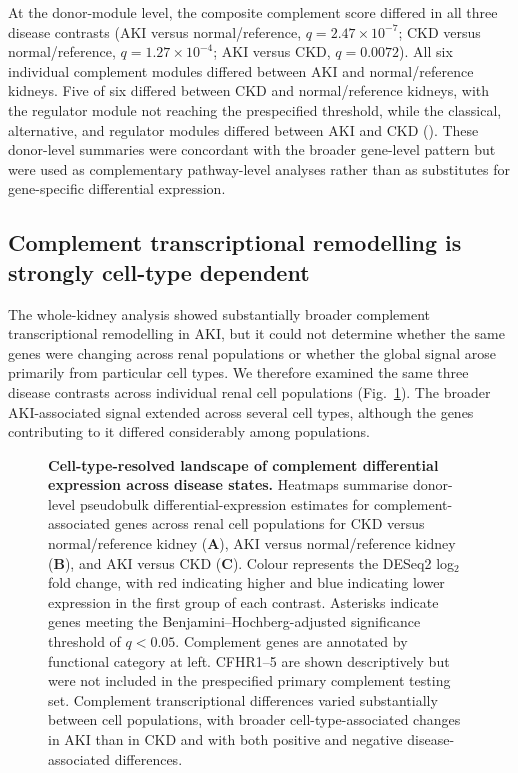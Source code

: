 \documentclass[10pt,letterpaper]{article}
\begin{document}
At the donor-module level, the composite complement score differed in all three disease contrasts (AKI versus normal/reference, $q=2.47\times10^{-7}$; CKD versus normal/reference, $q=1.27\times10^{-4}$; AKI versus CKD, $q=0.0072$). All six individual complement modules differed between AKI and normal/reference kidneys. Five of six differed between CKD and normal/reference kidneys, with the regulator module not reaching the prespecified threshold, while the classical, alternative, and regulator modules differed between AKI and CKD (). These donor-level summaries were concordant with the broader gene-level pattern but were used as complementary pathway-level analyses rather than as substitutes for gene-specific differential expression.


\subsection*{Complement transcriptional remodelling is strongly cell-type dependent}

The whole-kidney analysis showed substantially broader complement transcriptional remodelling in AKI, but it could not determine whether the same genes were changing across renal populations or whether the global signal arose primarily from particular cell types. We therefore examined the same three disease contrasts across individual renal cell populations (Fig.~\ref{fig:celltype_landscape}). The broader AKI-associated signal extended across several cell types, although the genes contributing to it differed considerably among populations.

\begin{figure}[!h]
\caption{\textbf{Cell-type-resolved landscape of complement differential expression across disease states.}
Heatmaps summarise donor-level pseudobulk differential-expression estimates for complement-associated genes across renal cell populations for CKD versus normal/reference kidney (\textbf{A}), AKI versus normal/reference kidney (\textbf{B}), and AKI versus CKD (\textbf{C}). Colour represents the DESeq2 log$_2$ fold change, with red indicating higher and blue indicating lower expression in the first group of each contrast. Asterisks indicate genes meeting the Benjamini--Hochberg-adjusted significance threshold of $q<0.05$. Complement genes are annotated by functional category at left. CFHR1--5 are shown descriptively but were not included in the prespecified primary complement testing set. Complement transcriptional differences varied substantially between cell populations, with broader cell-type-associated changes in AKI than in CKD and with both positive and negative disease-associated differences.}
\label{fig:celltype_landscape}
\end{figure}
\end{document}
